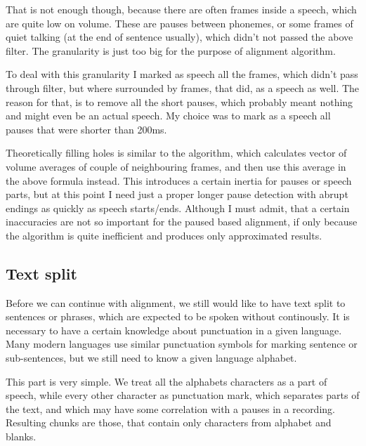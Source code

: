 \documentclass[12pt,a4paper,english]{article}
\begin{document}
That is not enough though, because there are often frames inside a speech, which are quite low on volume. These are pauses between phonemes, or some frames of quiet talking (at the end of sentence usually), which didn't not passed the above filter. The granularity is just too big for the purpose of alignment algorithm. \newline

To deal with this granularity I marked as speech all the frames, which didn't pass through filter, but where surrounded by frames, that did, as a speech as well.
The reason for that, is to remove all the short pauses, which probably meant nothing and might even be an actual speech. My choice was to mark as a speech all pauses that were shorter than 200ms. \newline

Theoretically filling holes is similar to the algorithm, which calculates vector of volume averages of couple of neighbouring frames, and then use this average in the above formula instead. This introduces a certain inertia for pauses or speech parts, but at this point I need just a proper longer pause detection with abrupt endings as quickly as speech starts/ends. Although I must admit, that a certain inaccuracies are not so important for the paused based alignment, if only because the algorithm is quite inefficient and produces only approximated results.

\newpage

\subsection{Text split}

Before we can continue with alignment, we still would like to have text split to sentences or phrases, which are expected to be spoken without continously. It is necessary to have a certain knowledge about punctuation in a given language.  Many modern languages use similar punctuation symbols for marking sentence or sub-sentences,
but we still need to know a given language alphabet. \newline

This part is very simple. We treat all the alphabets characters as a part of speech, while every other character as punctuation mark, which separates parts of the text, and which may have some correlation with a pauses in a recording. Resulting chunks are those, that contain only characters from alphabet and blanks. \newline
\end{document}
